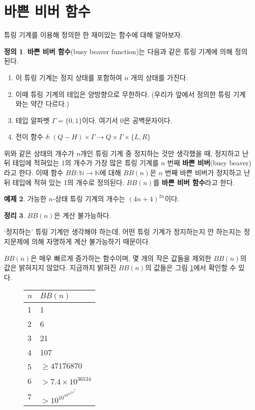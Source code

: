 \documentclass[b5paper, 11pt]{book}
\theoremstyle{definition}
\newtheorem{defn}{정의}[chapter]
\newtheorem{thm}[defn]{정리}
\newtheorem{ex}[defn]{예제}
\newenvironment{pf*}{\pushQED{\qed}\pf}
{\popQED\endpf}
\begin{document}
\section{바쁜 비버 함수}
튜링 기계를 이용해 정의한 한 재미있는 함수에 대해 알아보자.
\begin{defn}\label{bbdefn}
    \textbf{바쁜 비버 함수}(busy beaver function)는 다음과 같은 튜링 기계에 의해 정의된다.
    \begin{enumerate}
        \item 이 튜링 기계는 정지 상태를 포함하여 $n$ 개의 상태를 가진다.
        \item 이때 튜링 기계의 테입은 양방향으로 무한하다. (우리가 앞에서 정의한 
        튜링 기계와는 약간 다르다.)
        \item 테입 알파벳 $\Gamma = \{0, 1\}$이다. 여기서 0은 공백문자이다.
        \item 전이 함수 $\delta: (Q-H) \times \Gamma \rightarrow Q \times \Gamma \times \{L, R\}$
    \end{enumerate}
    위와 같은 상태의
    개수가 $n$개인 튜링 기계 중 정지하는 것만 생각했을 때, 정지하고 난 뒤 테입에 적혀있는
    1의 개수가 가장 많은 튜링 기계를 $n$ 번째 \textbf{바쁜 비버}(busy beaver)라고 한다. 이때 함수 $BB: \mathbb{N} \rightarrow \mathbb{N}$에 대해 $BB(n)$은 $n$ 번째 바쁜 비버가 정지하고 난 뒤 테입에 적혀 있는 1의 개수로 정의된다. $BB(n)$를 \textbf{바쁜 비버 함수}라고 한다.
\end{defn}
\begin{ex}
    가능한 $n$-상태 튜링 기계의 개수는 $(4n+4)^{2n}$이다.
\end{ex}
\begin{thm}
    $BB(n)$은 계산 불가능하다.
\end{thm}
\begin{pf*}
    `정지하는' 튜링 기계만 생각해야 하는데, 어떤  튜링 기계가 정지하는지 안 하는지는 정지문제에 의해 자명하게 계산 불가능하기 때문이다. 
\end{pf*} 
$BB(n)$은 매우 빠르게 증가하는 함수이며, 몇 개의 작은 값들을 제외한 $BB(n)$의 값은
밝혀지지 않았다. 지금까지 밝혀진 $BB(n)$의 값들은 그림 \ref{BB table}에서 확인할 수 있다.
\begin{figure}[!ht]
    \centering 
    \begin{tabular}{|l|l|}
        \hline
        $n$ & $BB(n)$        \\ \hline
        1   & 1              \\ \hline
        2   & 6              \\ \hline
        3   & 21             \\ \hline
        4   & 107            \\ \hline
        5   & $\ge 47176870$ \\ \hline
        6   &  $> 7.4 \times 10^{36534}$           \\ \hline
        7   &   $> 10^{10^{10^{10^{10^7}}}}$             \\ \hline
        \end{tabular}
    \caption{}
    \label{BB table}
\end{figure}
\end{document}
